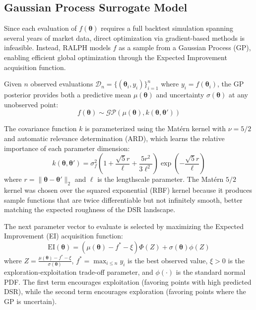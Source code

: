 \documentclass[conference]{IEEEtran}
\begin{document}
\subsection{Gaussian Process Surrogate Model}

Since each evaluation of $f(\boldsymbol{\theta})$ requires a full backtest simulation spanning several years of market data, direct optimization via gradient-based methods is infeasible. Instead, RALPH models $f$ as a sample from a Gaussian Process (GP), enabling efficient global optimization through the Expected Improvement acquisition function.

Given $n$ observed evaluations $\mathcal{D}_n = \{(\boldsymbol{\theta}_i, y_i)\}_{i=1}^{n}$ where $y_i = f(\boldsymbol{\theta}_i)$, the GP posterior provides both a predictive mean $\mu(\boldsymbol{\theta})$ and uncertainty $\sigma(\boldsymbol{\theta})$ at any unobserved point:
\begin{equation}
    f(\boldsymbol{\theta}) \sim \mathcal{GP}(\mu(\boldsymbol{\theta}), k(\boldsymbol{\theta}, \boldsymbol{\theta}'))
\end{equation}

The covariance function $k$ is parameterized using the Mat\'{e}rn kernel with $\nu = 5/2$ and automatic relevance determination (ARD), which learns the relative importance of each parameter dimension:
\begin{equation}
    k(\boldsymbol{\theta}, \boldsymbol{\theta}') = \sigma_f^2 \left(1 + \frac{\sqrt{5}r}{\ell} + \frac{5r^2}{3\ell^2}\right) \exp\left(-\frac{\sqrt{5}r}{\ell}\right)
\end{equation}
where $r = \|\boldsymbol{\theta} - \boldsymbol{\theta}'\|_2$ and $\ell$ is the lengthscale parameter. The Mat\'{e}rn $5/2$ kernel was chosen over the squared exponential (RBF) kernel because it produces sample functions that are twice differentiable but not infinitely smooth, better matching the expected roughness of the DSR landscape.

The next parameter vector to evaluate is selected by maximizing the Expected Improvement (EI) acquisition function:
\begin{equation}
    \text{EI}(\boldsymbol{\theta}) = (\mu(\boldsymbol{\theta}) - f^* - \xi)\Phi(Z) + \sigma(\boldsymbol{\theta})\phi(Z)
    \label{eq:ei}
\end{equation}
where $Z = \frac{\mu(\boldsymbol{\theta}) - f^* - \xi}{\sigma(\boldsymbol{\theta})}$, $f^* = \max_{i \leq n} y_i$ is the best observed value, $\xi > 0$ is the exploration-exploitation trade-off parameter, and $\phi(\cdot)$ is the standard normal PDF. The first term encourages exploitation (favoring points with high predicted DSR), while the second term encourages exploration (favoring points where the GP is uncertain).
\end{document}
